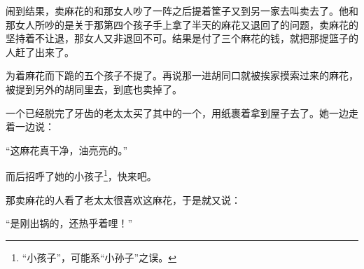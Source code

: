 \par 闹到结果，卖麻花的和那女人吵了一阵之后提着筐子又到另一家去叫卖去了。他和那女人所吵的是关于那第四个孩子手上拿了半天的麻花又退回了的问题，卖麻花的坚持着不让退，那女人又非退回不可。结果是付了三个麻花的钱，就把那提篮子的人赶了出来了。
\par 为着麻花而下跪的五个孩子不提了。再说那一进胡同口就被挨家摸索过来的麻花，被提到另外的胡同里去，到底也卖掉了。
\par 一个已经脱完了牙齿的老太太买了其中的一个，用纸裹着拿到屋子去了。她一边走着一边说：
\par “这麻花真干净，油亮亮的。”
\par 而后招呼了她的小孩子\footnote{“小孩子”，可能系“小孙子”之误。}，快来吧。
\par 那卖麻花的人看了老太太很喜欢这麻花，于是就又说：
\par “是刚出锅的，还热乎着哩！”
